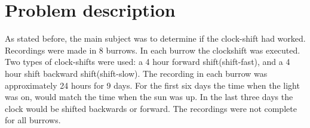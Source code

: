 \documentclass[a4paper]{article}
\begin{document}
\section*{Problem description}
As stated before, the main subject was to determine if the clock-shift had worked. Recordings were made in 8 burrows. In each burrow the clockshift was executed. Two types of clock-shifts were used: a 4 hour forward shift(shift-fast), and a 4 hour shift backward shift(shift-slow). The recording in each burrow was approximately 24 hours for 9 days. For the first six days the time when the light was on, would match the time when the sun was up. In the last three days the clock would be shifted backwards or forward. The recordings were not complete for all burrows.
\begin{table}[H]
    \centering


\end{table}
\end{document}
